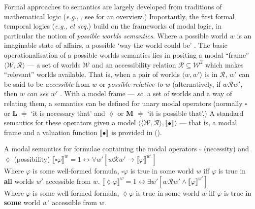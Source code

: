 \documentclass[12pt,dvipsnames]{report}
\providecommand{\denote}[2][]{\ensuremath{\llbracket{#2}\rrbracket^{#1}}}
\begin{document}
Formal approaches to semantics are largely developed from traditions of mathematical logic (\textit{e.g.}, \citealp{Montague1970}, see \citealp{Janssen2016} for an overview.) Importantly, the first formal temporal logics (\textit{e.g.}, \citealp{Prior1957} \textit{et seq.}) build on the frameworks of modal logic, in particular the notion of \textit{possible worlds semantics}. Where a possible world $ w $ is an imaginable state of affairs, a possible `way the world could be' \citep[\textit{e.g.},][]{Lewis1986}. The basic operationalisation of a possible worlds semantics lies in positing a modal ``frame'' $ \langle\mathcal{W,R}\rangle $ --- a set of worlds $ \mathcal W $ and an accessibility relation $ \mathcal{R\subseteq W}^2$ which makes ``relevant'' worlds available. That is, when a pair of worlds $\langle w,w' \rangle$ is in $ \mathcal R $, $ w' $ can be said to be \textit{accessible} from $ w $ or \textit{possible-relative-to} $ w $ (alternatively, if $ w\mathcal Rw' $, then $ w $ \textit{can see} $ w' $ \citep[37]{HC1996}. With a model frame --- \textit{sc.} a set of worlds and a way of relating them, a semantics can be defined for unary modal operators (normally $ \square $ or \textbf{L} $ \doteqdot $ `it is necessary that' and $ \lozenge $ or \textbf{M} $ \doteqdot $ `it is possible that'.) A standard semantics for these operators given a model $ \langle\mathcal{\langle W,R\rangle},\denote{•}\rangle $ --- that is, a modal frame and a valuation function \denote{•} is provided in (\nextx).


\pex A modal semantics for formulae containing the modal operators $ \square $ (necessity) and $ \lozenge $ (possibility)  
\a$ \denote[w]{\square\varphi} =1\leftrightarrow\forall w'[w\mathcal{R} w'\to\denote[w']{\varphi}] $\\
Where $ \varphi $ is some well-formed formula, $ \square\varphi $ is true in some world $ w $ iff $ \varphi $ is true in \textbf{all} worlds $ w' $ accessible from $ w $.
\a$  \denote[w]{\lozenge\varphi} =1\leftrightarrow\exists w'[w\mathcal{R} w'\wedge\denote[w']{\varphi}] $\\
Where $ \varphi $ is some well-formed formula, $ \lozenge\varphi $ is true in some world $ w $ iff $ \varphi $ is true in \textbf{some} world $ w' $ accessible from $ w $.
\xe
\end{document}

